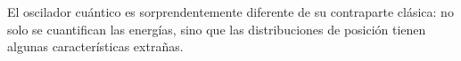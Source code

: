 \newpage
El oscilador cuántico es sorprendentemente diferente de su contraparte clásica: no solo se cuantifican las energías, sino que las distribuciones de posición tienen algunas características extrañas. 
